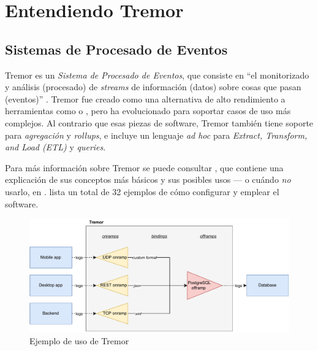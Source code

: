 
\chapter{Entendiendo Tremor}\label{ch:tremor}

\section{Sistemas de Procesado de Eventos}

Tremor es un \emph{Sistema de Procesado de Eventos}, que consiste en ``el
monitorizado y análisis (procesado) de \emph{streams} de información (datos)
sobre cosas que pasan (eventos)'' \cite{luckham2011event}. Tremor fue creado
como una alternativa de alto rendimiento a herramientas como \textcite{logstash}
o \textcite{telegraf}, pero ha evolucionado para soportar casos de uso más
complejos. Al contrario que esas piezas de software, Tremor también tiene
soporte para \emph{agregación} y \emph{rollups}, e incluye un lenguaje \emph{ad
hoc} para \emph{Extract, Transform, and Load (ETL)} y \emph{queries}.

Para más información sobre Tremor se puede consultar \textcite{tremorintro}, que
contiene una explicación de sus conceptos más básicos y sus posibles usos --- o
cuándo \emph{no} usarlo, en \textcite{tremorconstraints}.
\textcite{tremorrecipes} lista un total de 32 ejemplos de cómo configurar y
emplear el software.

\begin{figure}
    \centering
    \includegraphics[width=\textwidth]{./Imagenes/example.pdf}
    \caption{Ejemplo de uso de Tremor}%
    \label{fig:example_tremor}
\end{figure}

